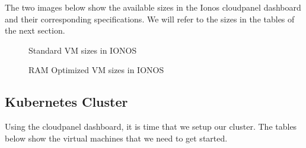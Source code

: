 The two images below show the available  sizes in the Ionos cloudpanel dashboard and their corresponding specifications.
We will refer to the sizes in the tables of the next section.
\begin{figure}[H]
    \centering
    \caption{Standard VM sizes in IONOS}
    \label{fig:standard-vm-sizes}
\end{figure}
\begin{figure}[H]
    \centering
    \caption{RAM Optimized VM sizes in IONOS}
    \label{fig:ram-optimized-vm-sizes}
\end{figure}

\subsection{Kubernetes Cluster}
Using the cloudpanel dashboard, it is time that we setup our cluster.
The tables below show the virtual machines that we need to get started.


